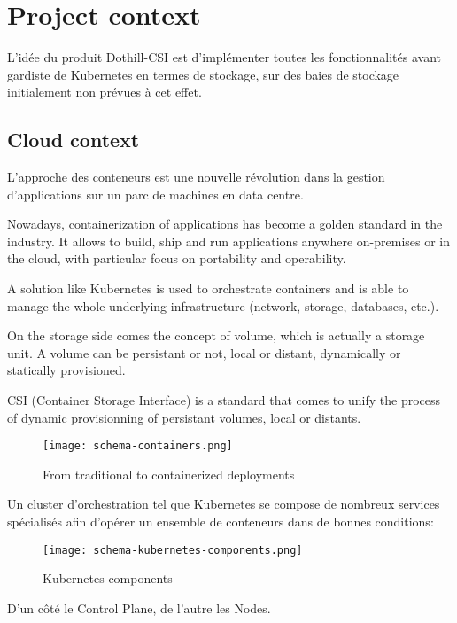 \section{Project context}

\color{darkgreen}
L'idée du produit Dothill-CSI est d'implémenter toutes les fonctionnalités avant gardiste de Kubernetes en termes de stockage, sur des baies de stockage initialement non prévues à cet effet.
\color{black}

\subsection{Cloud context}

\color{darkgreen}
L'approche des conteneurs est une nouvelle révolution dans la gestion d'applications sur un parc de machines en data centre.

Nowadays, containerization of applications has become a golden standard in the industry. It allows to build, ship and run applications anywhere on-premises or in the cloud, with particular focus on portability and operability.

A solution like Kubernetes is used to orchestrate containers and is able to manage the whole underlying infrastructure (network, storage, databases, etc.).

On the storage side comes the concept of volume, which is actually a storage unit. A volume can be persistant or not, local or distant, dynamically or statically provisioned.

CSI (Container Storage Interface) is a standard that comes to unify the process of dynamic provisionning of persistant volumes, local or distants.

\begin{figure}[h]
    \centering
    \texttt{[image: schema-containers.png]}
    \caption{From traditional to containerized deployments}
\end{figure}

Un cluster d'orchestration tel que Kubernetes se compose de nombreux services spécialisés afin d'opérer un ensemble de conteneurs dans de bonnes conditions:

\begin{figure}[h]
    \centering
    \texttt{[image: schema-kubernetes-components.png]}
    \caption{Kubernetes components}
\end{figure}

D'un côté le Control Plane, de l'autre les Nodes.

